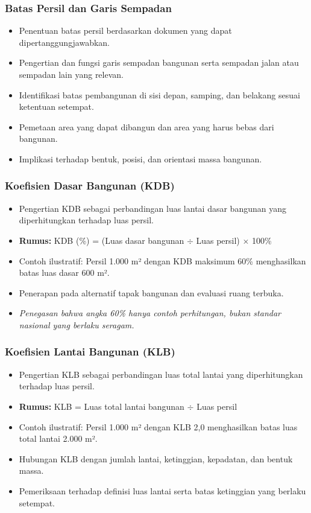 \documentclass[../main.tex]{subfiles}
\begin{document}
\begin{frame}[mytitle=standard, c, mycolor=digiPH_cream]
	\frametitle{Batas Persil dan Garis Sempadan}
	\begin{itemize}
		\item Penentuan batas persil berdasarkan dokumen yang dapat dipertanggungjawabkan.
		\item Pengertian dan fungsi garis sempadan bangunan serta sempadan jalan atau sempadan lain yang relevan.
		\item Identifikasi batas pembangunan di sisi depan, samping, dan belakang sesuai ketentuan setempat.
		\item Pemetaan area yang dapat dibangun dan area yang harus bebas dari bangunan.
		\item Implikasi terhadap bentuk, posisi, dan orientasi massa bangunan.
	\end{itemize}
\end{frame}

\begin{frame}[mytitle=standard, t, mycolor=white]
	\frametitle{Koefisien Dasar Bangunan (KDB)}
	\begin{itemize}
		\item Pengertian KDB sebagai perbandingan luas lantai dasar bangunan yang diperhitungkan terhadap luas persil.
		\item \textbf{Rumus:} KDB (\%) = (Luas dasar bangunan $\div$ Luas persil) $\times$ 100\%
		\item Contoh ilustratif: Persil 1.000 m² dengan KDB maksimum 60\% menghasilkan batas luas dasar 600 m².
		\item Penerapan pada alternatif tapak bangunan dan evaluasi ruang terbuka.
		\item \textit{Penegasan bahwa angka 60\% hanya contoh perhitungan, bukan standar nasional yang berlaku seragam.}
	\end{itemize}
\end{frame}

\begin{frame}[mytitle=standard, t, mycolor=digiPH_gray]
	\frametitle{Koefisien Lantai Bangunan (KLB)}
	\begin{itemize}
		\item Pengertian KLB sebagai perbandingan luas total lantai yang diperhitungkan terhadap luas persil.
		\item \textbf{Rumus:} KLB = Luas total lantai bangunan $\div$ Luas persil
		\item Contoh ilustratif: Persil 1.000 m² dengan KLB 2,0 menghasilkan batas luas total lantai 2.000 m².
		\item Hubungan KLB dengan jumlah lantai, ketinggian, kepadatan, dan bentuk massa.
		\item Pemeriksaan terhadap definisi luas lantai serta batas ketinggian yang berlaku setempat.
	\end{itemize}
\end{frame}
\end{document}
